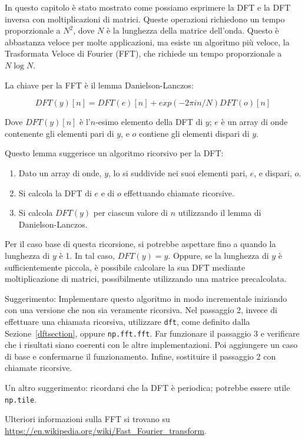 \documentclass[12pt]{book} \usepackage[width=5.5in,height=8.5in, hmarginratio=3:2,vmarginratio=1:1]{geometry}
\begin{document}
\begin{exercise} In questo capitolo è stato mostrato come possiamo esprimere la DFT e la DFT inversa con moltiplicazioni di matrici. Queste operazioni richiedono un tempo proporzionale a $N^2$, dove $N$ è la lunghezza della matrice dell'onda. Questo è abbastanza veloce per molte applicazioni, ma esiste un algoritmo più veloce, la Trasformata Veloce di Fourier (FFT), che richiede un tempo proporzionale a $N \log N$.

La chiave per la FFT è il lemma Danielson-Lanczos:

%
\[ DFT(y)[n] = DFT(e)[n] + exp(-2 \pi i n / N) DFT(o)[n] \] 

%
Dove $ DFT(y)[n]$ è l'$n$-esimo elemento della DFT di $y$; $e$ è un array di onde contenente gli elementi pari di $y$, e $o$ contiene gli elementi dispari di $y$.

Questo lemma suggerisce un algoritmo ricorsivo per la DFT:

\begin{enumerate} 

\item Dato un array di onde, $y$, lo si suddivide nei suoi elementi pari, $e$, e dispari, $o$.

\item Si calcola la DFT di $e$ e di $o$ effettuando chiamate ricorsive.

\item Si calcola $DFT(y)$ per ciascun valore di $n$ utilizzando il lemma di Danielson-Lanczos.

\end{enumerate} 

Per il caso base di questa ricorsione, si potrebbe aspettare fino a quando la lunghezza di $y$ è 1. In tal caso, $DFT(y) = y$. Oppure, se la lunghezza di $y$ è sufficientemente piccola, è possibile calcolare la sua DFT mediante moltiplicazione di matrici, possibilmente utilizzando una matrice precalcolata.

Suggerimento: Implementare questo algoritmo in modo incrementale iniziando con una versione che non sia veramente ricorsiva. Nel passaggio 2, invece di effettuare una chiamata ricorsiva, utilizzare {\tt dft}, come definito dalla Sezione~\ref{dftsection}, oppure {\tt np.fft.fft}. Far funzionare il passaggio 3 e verificare che i risultati siano coerenti con le altre implementazioni. Poi aggiungere un caso di base e confermarne il funzionamento. Infine, sostituire il passaggio 2 con chiamate ricorsive.

Un altro suggerimento: ricordarsi che la DFT è periodica; potrebbe essere utile {\tt np.tile}.

Ulteriori informazioni sulla FFT si trovano su \url{https://en.wikipedia.org/wiki/Fast_Fourier_transform}.

\end{exercise} 
\end{document}
